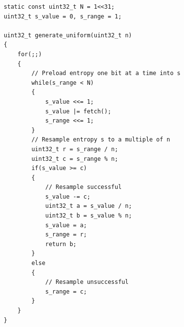 \documentclass[12pt]{article}
\begin{document}
\begin{verbatim}
    static const uint32_t N = 1<<31;
    uint32_t s_value = 0, s_range = 1;

    uint32_t generate_uniform(uint32_t n)
    {
        for(;;)
        {
            // Preload entropy one bit at a time into s
            while(s_range < N)
            {
                s_value <<= 1;
                s_value |= fetch();
                s_range <<= 1;
            }
            // Resample entropy s to a multiple of n
            uint32_t r = s_range / n;
            uint32_t c = s_range % n;
            if(s_value >= c)
            {
                // Resample successful
                s_value -= c;
                uint32_t a = s_value / n;
                uint32_t b = s_value % n;
                s_value = a;
                s_range = r; 
                return b;
            }
            else
            {
                // Resample unsuccessful
                s_range = c;
            }
        }
    }
\end{verbatim}
\end{document}
